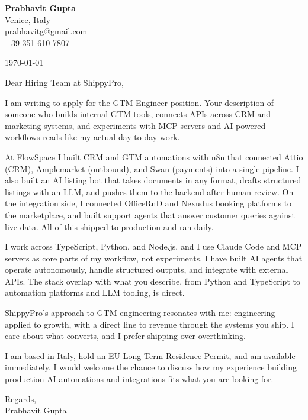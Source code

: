 \documentclass[a4paper,11pt]{letter}
\begin{document}
{\large\textbf{Prabhavit Gupta}}\\
Venice, Italy\\
prabhavitg@gmail.com\\
+39 351 610 7807

\vspace{12pt}
\today

\vspace{12pt}
Dear Hiring Team at ShippyPro,

I am writing to apply for the GTM Engineer position. Your description of someone who builds internal GTM tools, connects APIs across CRM and marketing systems, and experiments with MCP servers and AI-powered workflows reads like my actual day-to-day work.

At FlowSpace I built CRM and GTM automations with n8n that connected Attio (CRM), Amplemarket (outbound), and Swan (payments) into a single pipeline. I also built an AI listing bot that takes documents in any format, drafts structured listings with an LLM, and pushes them to the backend after human review. On the integration side, I connected OfficeRnD and Nexudus booking platforms to the marketplace, and built support agents that answer customer queries against live data. All of this shipped to production and ran daily.

I work across TypeScript, Python, and Node.js, and I use Claude Code and MCP servers as core parts of my workflow, not experiments. I have built AI agents that operate autonomously, handle structured outputs, and integrate with external APIs. The stack overlap with what you describe, from Python and TypeScript to automation platforms and LLM tooling, is direct.

ShippyPro's approach to GTM engineering resonates with me: engineering applied to growth, with a direct line to revenue through the systems you ship. I care about what converts, and I prefer shipping over overthinking.

I am based in Italy, hold an EU Long Term Residence Permit, and am available immediately. I would welcome the chance to discuss how my experience building production AI automations and integrations fits what you are looking for.

Regards,\\
Prabhavit Gupta
\end{document}
